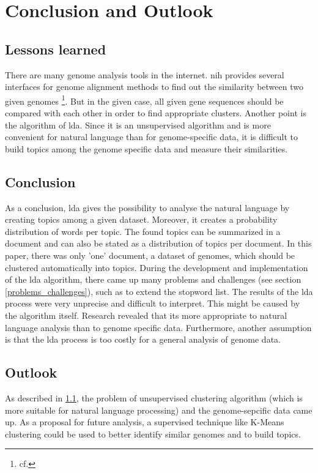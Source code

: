 \chapter{Conclusion and Outlook}\label{conclusion_outlook}
\section{Lessons learned}\label{lessons_learned}

There are many genome analysis tools in the internet. \ac{nih} provides several interfaces for genome alignment methods to find out the similarity between two given genomes \footnote{cf.\autocite{blast}}.
But in the given case, all given gene sequences should be compared with each other in order to find appropriate clusters.
Another point is the algorithm of \ac{lda}. Since it is an unsupervised algorithm and is more convenient for natural language than for genome-specific data, it is difficult to build topics among the genome specific data and measure their similarities.

\section{Conclusion}\label{conclusion}

As a conclusion, \ac{lda} gives the possibility to analyse the natural language by creating topics among a given dataset. Moreover, it creates a probability distribution of words per topic. The found topics can be summarized in a document and can also be stated as a distribution of topics per document. 
In this paper, there was only 'one' document, a dataset of genomes, which should be clustered automatically into topics. During the development and implementation of the \ac{lda} algorithm, there came up many problems and challenges (see section \ref{problems_challenges}), such as to extend the stopword list.
The results of the \ac{lda} process were very unprecise and difficult to interpret. This might be caused by the algorithm itself. Research revealed that its more appropriate to natural language analysis than to genome specific data. Furthermore, another assumption is that the \ac{lda} process is too costly for a general analysis of genome data. 

\section{Outlook}\label{outlook}

As described in \ref{lessons_learned}, the problem of unsupervised clustering algorithm (which is more suitable for natural language processing) and the genome-sepcific data came up. As a proposal for future analysis, a supervised technique like K-Means clustering could be used to better  identify similar genomes and to build topics. 

